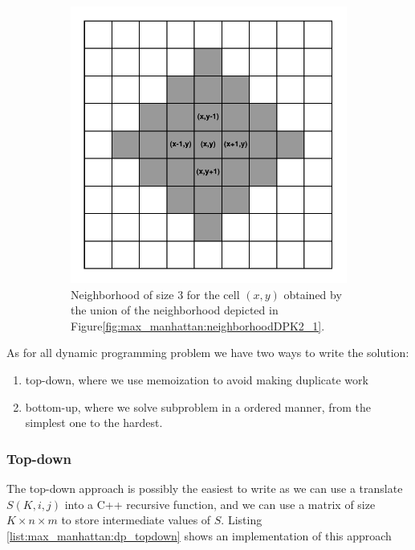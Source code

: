 \begin{figure}
	\hfill
	
	\begin{subfigure}[t]{0.4\textwidth}
		\centering
		\includegraphics[width=\textwidth]{sources/max_manhattan/images/neighborhoodDPK2_2}
		\caption[]{Neighborhood of size $3$ for the cell $(x,y)$ obtained by the union of the neighborhood depicted in Figure\ref{fig:max_manhattan:neighborhoodDPK2_1}.}
		\label{fig:max_manhattan:neighborhoodDPK2_2}
	 \end{subfigure}
	 \label{}
	 \caption{}
\end{figure}


As for all dynamic programming problem we have two ways to write the solution: \begin{enumerate}
	\item top-down, where we use memoization to avoid making duplicate work
	\item bottom-up, where we solve subproblem in a ordered manner, from the simplest one to the hardest.
\end{enumerate}

\subsubsection{Top-down}
The top-down approach is possibly the easiest to write  as we can use a translate $S(K,i,j)$ into a C++ recursive function, 
and we can use a matrix of size $K\times n\times m$ to store intermediate values of $S$.
Listing \ref{list:max_manhattan:dp_topdown} shows an implementation of this approach

